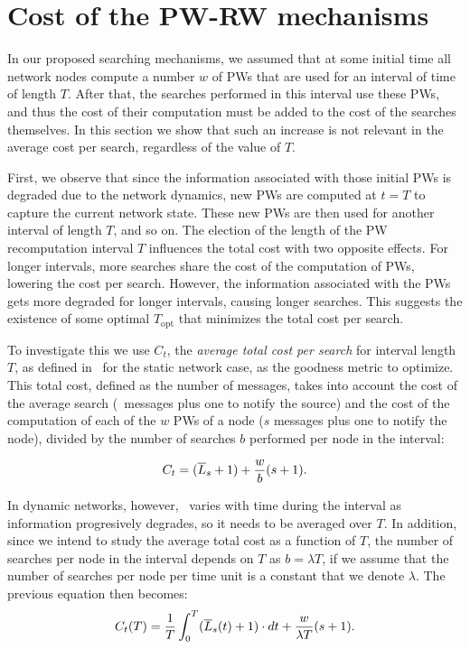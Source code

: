 \documentclass[]{elsarticle}
\newcommand{\s}		{\ensuremath{s}}		\newcommand{\sopt}	{\ensuremath{s_{opt}}}		\newcommand{\p}		{\ensuremath{p}}		\newcommand{\W}		{\ensuremath{W}}		\newcommand{\w}		{\ensuremath{w}}		\newcommand{\lsave}	{\ensuremath{\overline{l}_s}}	\newcommand{\lave}	{\ensuremath{\overline{l}}}	\newcommand{\lopt}	{\ensuremath{\overline{l}_{opt}}}
\begin{document}
\section{Cost of the PW-RW mechanisms}
\label{sec:cost}

In our proposed searching mechanisms, we assumed that at some initial time all network nodes compute a number $w$ of PWs that are used for an interval of time of length $T$. After that, the searches performed in this interval use these PWs, and thus the cost of their computation must be added to the cost of the searches themselves. In this section we show that such an increase is not relevant in the average cost per search, regardless of the value of $T$.

First, we observe that since the information associated with those initial PWs is degraded due to the network dynamics, new PWs are computed at $t\!=\!T$ to capture the current network state. These new PWs are then used for another interval of length $T$, and so on. The election of the length of the PW recomputation interval $T$ influences the total cost with two opposite effects. For longer intervals, more searches share the cost of the computation of PWs, lowering the cost per search. However, the information associated with the PWs gets more degraded for longer intervals, causing longer searches. This suggests the existence of some optimal $T_\mathrm{opt}$ that minimizes the total cost per search.

To investigate this we use $C_t$, the \emph{average total cost per search} for interval length $T$, as defined in~\cite{Lopez:Computing} for the static network case, as the goodness metric to optimize. This total cost, defined as the number of messages, takes into account the cost of the average search (\Lsexp\ messages plus one to notify the source) and the cost of the computation of each of the $w$ PWs of a node ($s$ messages plus one to notify the node), divided by the number of searches $b$ performed per node in the interval:
 
\begin{equation}
 C_t = (\Lsexp+1) + \frac{w}{b}(\s+1).
 \label{eq:Ct}
\end{equation} 

In dynamic networks, however, \Lsexp\ varies with time during the interval as information progresively degrades, so it needs to be averaged over $T$. In addition, since we intend to study the average total cost as a function of $T$, the number of searches per node in the interval depends on $T$ as $b = \lambda T$, if we assume that the number of searches per node per time unit is a constant that we denote $\lambda$. The previous equation then becomes:
\begin{equation}
 C_t(T) = \frac{1}{T}\int_0^T(\Lsexp(t)+1) \cdot dt + \frac{w}{\lambda T}(\s+1).
 \label{eq:Ct_t}
\end{equation}
\end{document}
